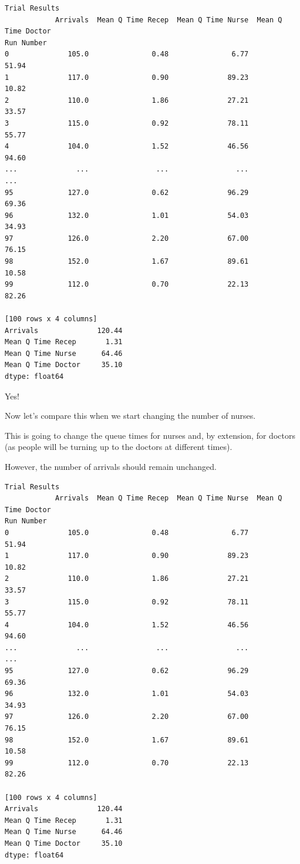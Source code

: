 \documentclass[
  letterpaper,
  DIV=11,
  numbers=noendperiod]{scrreprt}
\begin{document}
\begin{verbatim}
Trial Results
            Arrivals  Mean Q Time Recep  Mean Q Time Nurse  Mean Q Time Doctor
Run Number                                                                    
0              105.0               0.48               6.77               51.94
1              117.0               0.90              89.23               10.82
2              110.0               1.86              27.21               33.57
3              115.0               0.92              78.11               55.77
4              104.0               1.52              46.56               94.60
...              ...                ...                ...                 ...
95             127.0               0.62              96.29               69.36
96             132.0               1.01              54.03               34.93
97             126.0               2.20              67.00               76.15
98             152.0               1.67              89.61               10.58
99             112.0               0.70              22.13               82.26

[100 rows x 4 columns]
Arrivals              120.44
Mean Q Time Recep       1.31
Mean Q Time Nurse      64.46
Mean Q Time Doctor     35.10
dtype: float64
\end{verbatim}

Yes!

Now let's compare this when we start changing the number of nurses.

This is going to change the queue times for nurses and, by extension,
for doctors (as people will be turning up to the doctors at different
times).

However, the number of arrivals should remain unchanged.

\begin{verbatim}
Trial Results
            Arrivals  Mean Q Time Recep  Mean Q Time Nurse  Mean Q Time Doctor
Run Number                                                                    
0              105.0               0.48               6.77               51.94
1              117.0               0.90              89.23               10.82
2              110.0               1.86              27.21               33.57
3              115.0               0.92              78.11               55.77
4              104.0               1.52              46.56               94.60
...              ...                ...                ...                 ...
95             127.0               0.62              96.29               69.36
96             132.0               1.01              54.03               34.93
97             126.0               2.20              67.00               76.15
98             152.0               1.67              89.61               10.58
99             112.0               0.70              22.13               82.26

[100 rows x 4 columns]
Arrivals              120.44
Mean Q Time Recep       1.31
Mean Q Time Nurse      64.46
Mean Q Time Doctor     35.10
dtype: float64
\end{verbatim}
\end{document}

